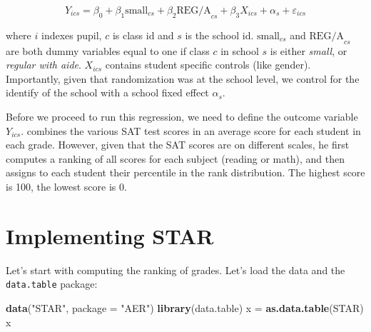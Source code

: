 \documentclass[]{book}
\newenvironment{Shaded}{\begin{snugshade}}{\end{snugshade}}
\newcommand{\DataTypeTok}[1]{\textcolor[rgb]{0.13,0.29,0.53}{#1}}
\newcommand{\KeywordTok}[1]{\textcolor[rgb]{0.13,0.29,0.53}{\textbf{#1}}}
\newcommand{\NormalTok}[1]{#1}
\newcommand{\StringTok}[1]{\textcolor[rgb]{0.31,0.60,0.02}{#1}}
\begin{document}
\begin{equation}
Y_{ics} = \beta_0 + \beta_1 \text{small}_{cs} + \beta_2 \text{REG/A}_{cs} + \beta_3 X_{ics} + \alpha_s + \varepsilon_{ics} \label{eq:krueger2}
\end{equation}

where \(i\) indexes pupil, \(c\) is class id and \(s\) is the school id. \(\text{small}_{cs}\) and \(\text{REG/A}_{cs}\) are both dummy variables equal to one if class \(c\) in school \(s\) is either \emph{small}, or \emph{regular with aide}. \(X_{ics}\) contains student specific controls (like gender). Importantly, given that randomization was at the school level, we control for the identify of the school with a school fixed effect \(\alpha_s\).

Before we proceed to run this regression, we need to define the outcome variable \(Y_{ics}\). \citet{krueger1999} combines the various SAT test scores in an average score for each student in each grade. However, given that the SAT scores are on different scales, he first computes a ranking of all scores for each subject (reading or math), and then assigns to each student their percentile in the rank distribution. The highest score is 100, the lowest score is 0.

\hypertarget{implementing-star}{%
\section{Implementing STAR}\label{implementing-star}}

Let's start with computing the ranking of grades. Let's load the data and the \texttt{data.table} package:

\begin{Shaded}
\begin{Highlighting}[]
\KeywordTok{data}\NormalTok{(}\StringTok{"STAR"}\NormalTok{, }\DataTypeTok{package =} \StringTok{"AER"}\NormalTok{)}
\KeywordTok{library}\NormalTok{(data.table)}
\NormalTok{x =}\StringTok{ }\KeywordTok{as.data.table}\NormalTok{(STAR)}
\NormalTok{x}
\end{Highlighting}
\end{Shaded}
\end{document}
